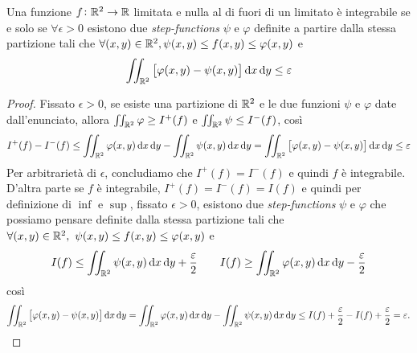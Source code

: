 \begin{prop} \label{prop:criterioint}
	Una funzione $ f \colon \mathbb{R}^2 \to \mathbb{R} $ limitata e nulla al di fuori di un limitato è integrabile se e solo se $ \forall \epsilon > 0 $ esistono due \emph{step-functions} $ \psi $ e $ \varphi $ definite a partire dalla stessa partizione tali che $ \forall (x, y) \in \mathbb{R}^2, \psi(x, y) \leq f(x, y) \leq \varphi(x, y) $ e 
	\begin{equation*}
		\iint_{\R^2} \left[\varphi(x, y) - \psi(x, y)\right] \dif{x} \dif{y} \leq \epsilon
	\end{equation*}
\end{prop}
%
\begin{proof}
	Fissato $ \epsilon > 0 $, se esiste una partizione di $ \mathbb{R}^2 $ e le due funzioni $ \psi $ e $ \varphi $ date dall'enunciato, allora $ \iint_{\mathbb{R}^2}  \varphi \geq I^+(f) $ e $ \iint_{\mathbb{R}^2} \psi \leq I^-(f) $, così
	\[
		I^+(f) - I^-(f) \leq \iint_{\R^2} \varphi(x, y) \dif{x} \dif{y} -  \iint_{\R^2} \psi(x, y) \dif{x} \dif{y} = \iint_{\R^2} \left[\varphi(x, y) - \psi(x, y)\right] \dif{x} \dif{y} \leq \epsilon
	\]
	Per arbitrarietà di $ \epsilon $, concludiamo che $ I^+(f) = I^-(f) $ e quindi $ f $ è integrabile. \\
	D'altra parte se $ f $ è integrabile, $ I^+(f) = I^-(f) = I(f) $ e quindi per definizione di $ \inf $ e $ \sup $, fissato $ \epsilon > 0 $, esistono due \emph{step-functions} $ \psi $ e $ \varphi $ che possiamo pensare definite dalla stessa partizione tali che $ \forall (x, y) \in \mathbb{R}^2, \ \psi(x, y) \leq f(x, y) \leq \varphi(x, y) $ e 
	\[
		I(f) \leq \iint_{\R^2} \psi(x, y) \dif{x} \dif{y} + \frac{\epsilon}{2} \qquad I(f) \geq \iint_{\R^2} \varphi(x, y) \dif{x} \dif{y} - \frac{\epsilon}{2}
	\]
	così
	\[
		\iint_{\R^2} \left[\varphi(x, y) - \psi(x, y)\right] \dif{x} \dif{y} = \iint_{\R^2} \varphi(x, y) \dif{x} \dif{y} - \iint_{\R^2} \psi(x, y) \dif{x} \dif{y} \leq I(f) + \frac{\epsilon}{2} - I(f) + \frac{\epsilon}{2} = \epsilon.
	\]
\end{proof}

